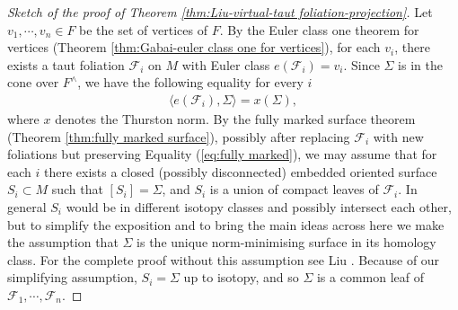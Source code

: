 \documentclass[10pt,a4paper]{amsart}
\begin{document}
\begin{proof}[Sketch of the proof of Theorem \ref{thm:Liu-virtual-taut foliation-projection}]
	
	Let $v_1, \cdots, v_n \in F$ be the set of vertices of $F$. By the Euler class one theorem for vertices (Theorem \ref{thm:Gabai-euler class one for vertices}), for each $v_i$, there exists a taut foliation $\mathcal{F}_i$ on $M$ with Euler class $e(\mathcal{F}_i) = v_i$. Since $\Sigma$ is in the cone over $F^\wedge$, we have the following equality for every $i$
	\begin{eqnarray}
		\langle e(\mathcal{F}_i) , \Sigma \rangle = x(\Sigma), 
		\label{eq:fully marked}
	\end{eqnarray}
	where $x$ denotes the Thurston norm.
	By the fully marked surface theorem (Theorem \ref{thm:fully marked surface}), possibly after replacing $\mathcal{F}_i$ with new foliations but preserving Equality (\ref{eq:fully marked}), we may assume that for each $i$ there exists a closed (possibly disconnected) embedded oriented surface $S_i \subset M$ such that $[S_i] = \Sigma$, and $S_i$ is a union of compact leaves of $\mathcal{F}_i$. In general $S_i$ would be in different isotopy classes and possibly intersect each other, but to simplify the exposition and to bring the main ideas across here we make the assumption that $\Sigma$ is the unique norm-minimising surface in its homology class. For the complete proof without this assumption see Liu \cite{liu2024criterion}. Because of our simplifying assumption, $S_i = \Sigma$ up to isotopy, and so $\Sigma$ is a common leaf of $\mathcal{F}_1, \cdots, \mathcal{F}_n$. 
	

\end{proof}
\end{document}
